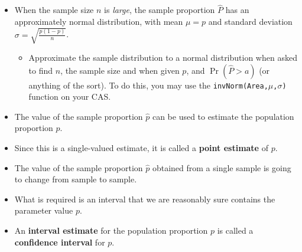 \documentclass[12pt,a4paper,titlepage]{article}
\begin{document}
            \begin{SummaryBox}[title=Normal approximation of the sample distribution]
                \begin{itemize}[leftmargin=*]
                    \item When the sample size $n$ is \textit{large}, the sample proportion $\hat{P}$ has an approximately normal distribution, with mean $\mu = p$ and standard deviation $\sigma = \sqrt{ \frac{p(1-p)}{n} }$.
                    \begin{itemize}[topsep=0pt]
                        \item Approximate the sample distribution to a normal distribution when asked to find $n$, the sample size and when given $p$, and $\Pr(\hat{P} > a)$ (or anything of the sort). To do this, you may use the \texttt{invNorm(Area,$\mu$,$\sigma$)} function on your CAS.
                    \end{itemize}
                \end{itemize}
            \end{SummaryBox}
            
            \begin{SummaryBox}[title=Inference of the population]
                \begin{SummaryExtensionBox}[title=Point estimates]
                    \begin{itemize}[leftmargin=*]
                        \item The value of the sample proportion $\hat{p}$ can be used to estimate the population proportion $p$.
                        \item Since this is a single-valued estimate, it is called a \textbf{point estimate} of $p$.
                    \end{itemize}
                \end{SummaryExtensionBox}
                
                \begin{SummaryExtensionBox}[title=Interval estimates (confidence intervals)]
                    \begin{itemize}[leftmargin=*]
                        \item The value of the sample proportion $\hat{p}$ obtained from a single sample is going to change from sample to sample.
                        \item What is required is an interval that we are reasonably sure contains the parameter value $p$.
                        \item An \textbf{interval estimate} for the population proportion $p$ is called a \textbf{confidence interval} for $p$.
                    \end{itemize}
                \end{SummaryExtensionBox}
            \end{SummaryBox}
            
\end{document}
